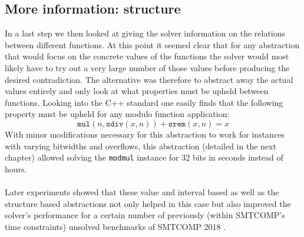 \subsection{More information: structure}
In a last step we then looked at giving the solver information on the relations between different functions. At this point it seemed clear that for any abstraction that would focus on the concrete values of the functions the solver would most likely have to try out a very large number of those values before producing the desired contradiction. The alternative was therefore to abstract away the actual values entirely and only look at what properties must be upheld between functions. Looking into the C++ standard \cite{ISO14882:2011} one easily finds that the following property must be upheld for any modulo function application:
\[
    \texttt{mul}\left( n, \texttt{sdiv}\left(x,n\right) \right) + \texttt{srem}\left(x,n\right) = x
\]
With minor modifications necessary for this abstraction to work for instances with varying bitwidths and overflows, this abstraction (detailed in the next chapter) allowed solving the \texttt{modmul} instance for 32 bits in seconds instead of hours.

\paragraph{}
Later experiments showed that these value and interval based as well as the structure based abstractions not only helped in this case but also improved the solver's performance for a certain number of previously (within SMTCOMP's time constraints) unsolved benchmarks of SMTCOMP 2018 \cite{SMTCOMP18}.